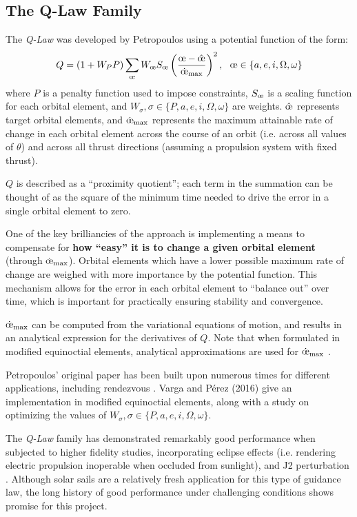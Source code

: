\subsection{The Q-Law Family}
The \textit{Q-Law} was developed by Petropoulos \cite{petropoulos2004low} using a potential function of the form:
\begin{equation}
  Q = (1 + W_P P) \sum_{\moe} W_\moe S_\moe \left(\frac{\moe - \hat{\moe}}{\dot{\moe}_{\max}} \right)^2, \ \  \moe \in \{a, e, i, \Omega, \omega\}
  \label{eq:q_law_petropulos}
\end{equation}
where $P$ is a penalty function used to impose constraints, $S_\moe$ is a scaling function for each orbital element, and $W_\sigma, \sigma \in \{P, a, e, i, \Omega, \omega\}$ are weights. $\hat{\moe}$ represents target orbital elements, and $\dot{\moe}_{\max}$ represents the maximum attainable rate of change in each orbital element across the course of an orbit (i.e. across all values of $\theta$) and across all thrust directions (assuming a propulsion system with fixed thrust).

$Q$ is described as a ``proximity quotient''; each term in the summation can be thought of as the square of the minimum time needed to drive the error in a single orbital element to zero.

One of the key brilliancies of the approach is implementing a means to compensate for \textbf{how ``easy'' it is to change a given orbital element} (through $\dot{\moe}_{\max}$). Orbital elements which have a lower possible maximum rate of change are weighed with more importance by the potential function. This mechanism allows for the error in each orbital element to ``balance out'' over time, which is important for practically ensuring stability and convergence.

$\dot{\moe}_{\max}$ can be computed from the variational equations of motion, and results in an analytical expression for the derivatives of $Q$. Note that when formulated in modified equinoctial elements, analytical approximations are used for $\dot{\moe}_{\max}$ \cite{vargaperez2016, sanjeev2023}.

Petropoulos' original paper has been built upon numerous times for different applications, including rendezvous \cite{sanjeev2023}. Varga and Pérez (2016) \cite{vargaperez2016} give an implementation in modified equinoctial elements, along with a study on optimizing the values of $W_\sigma, \sigma \in \{P, a, e, i, \Omega, \omega\}$.

The \textit{Q-Law} family has demonstrated remarkably good performance when subjected to higher fidelity studies, incorporating eclipse effects (i.e. rendering electric propulsion inoperable when occluded from sunlight), and J2 perturbation \cite{vargaperez2016}. Although solar sails are a relatively fresh application for this type of guidance law, the long history of good performance under challenging conditions shows promise for this project.

